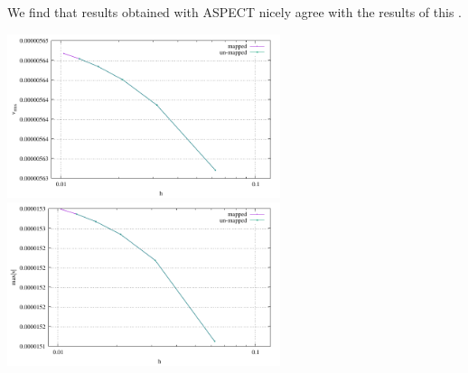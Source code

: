 We find that results obtained with ASPECT nicely agree with the results of this \stone.

\begin{center}
\includegraphics[width=8cm]{python_codes/fieldstone_76/results/block_rd/vrms.pdf}
\includegraphics[width=8cm]{python_codes/fieldstone_76/results/block_rd/maxvel.pdf}
\end{center}

